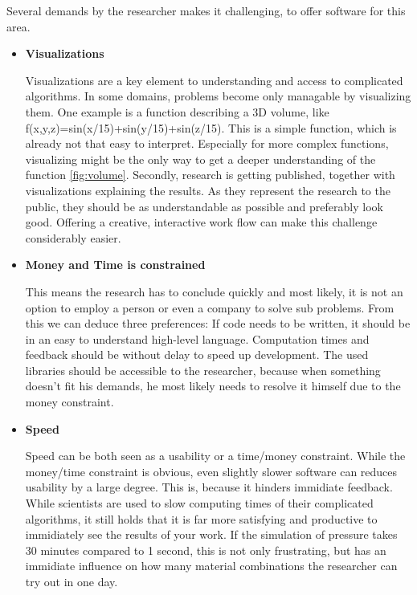 Several demands by the researcher makes it challenging, to offer software for this area.

\begin{itemize} 

    \item  \textbf{Visualizations}

    Visualizations are a key element to understanding and access to complicated algorithms.
    In some domains, problems become only managable by visualizing them. 
    One example is a function describing a 3D volume, 
    like f(x,y,z)=sin(x/15)+sin(y/15)+sin(z/15). 
    This is a simple function, which is already not that easy to interpret. Especially for more complex functions, visualizing might be the only way to get a deeper understanding of the function \ref{fig:volume}.
    Secondly, research is getting published, together with visualizations explaining the results. As they represent the research to the public, they should be as understandable as possible and preferably look good.
    Offering a creative, interactive work flow can make this challenge considerably easier.


    \item \textbf{Money and Time is constrained}
    
    This means the research has to conclude quickly and most likely, it is not an option to employ a person or even a company to solve sub problems.
    From this we can deduce three preferences: If code needs to be written, it should be in an easy to understand high-level language. Computation times and feedback should be without delay to speed up development. The used libraries should be accessible to the researcher, because when something doesn't fit his demands, he most likely needs to resolve it himself due to the money constraint.

    \item \textbf{Speed}
    
    Speed can be both seen as a usability or a time/money constraint. While the money/time constraint is obvious, even slightly slower software can reduces usability by a large degree.
    This is, because it hinders immidiate feedback. 
    While scientists are used to slow computing times of their complicated algorithms, it still holds that it is far more satisfying and productive to immidiately see the results of your work. If the simulation of pressure takes 30 minutes compared to 1 second, this is not only frustrating, but has an immidiate influence on how many material combinations the researcher can try out in one day.
\end{itemize} 


